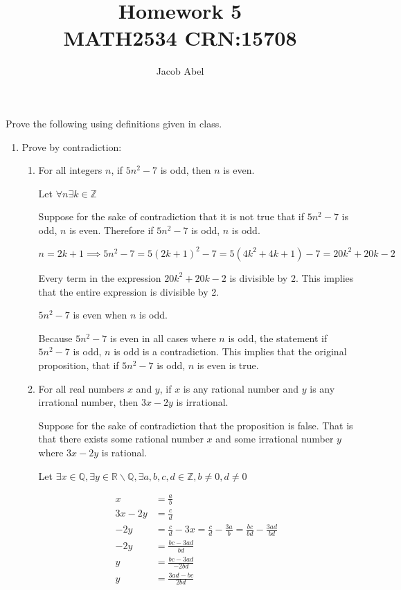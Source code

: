 \documentclass[12pt,letterpaper,titlepage]{article}
\author{Jacob Abel}
\title{	Homework 5
	\\\large MATH2534 CRN:15708
}
\begin{document}
\maketitle
\begin{raggedright}
Prove the following using definitions given in class.
\begin{enumerate}


\item Prove by contradiction:
\begin{enumerate}[label=(\alph*)]
\item For all integers $n$, if $5n^2 − 7$ is odd, then $n$ is even.

Let $\forall n \exists k \in\mathbb{Z}$

Suppose for the sake of contradiction that it is not true that if $5n^2 − 7$ is odd, $n$ is even. Therefore if $5n^2-7$ is odd, $n$ is odd.

\begin{equation*}
n = 2k + 1 \implies 5n^2-7 = 5 (2k+1)^2 - 7 = 5(4k^2+4k+1) - 7 = 20k^2+20k-2
\end{equation*}

Every term in the expression $20k^2+20k-2$ is divisible by $2$. This implies that the entire expression is divisible by 2.

$5n^2-7$ is even when $n$ is odd.

Because $5n^2-7$ is even in all cases where $n$ is odd, the statement if $5n^2-7$ is odd, $n$ is odd is a contradiction. This implies that the original proposition, that if $5n^2 − 7$ is odd, $n$ is even is true.

\item For all real numbers $x$ and $y$, if $x$ is any rational number and $y$ is any irrational number, then $3x−2y$ is irrational.

Suppose for the sake of contradiction that the proposition is false. That is that there exists some rational number $x$ and some irrational number $y$ where $3x-2y$ is rational.

Let $\exists x \in \mathbb{Q}, \exists y \in \mathbb{R\backslash Q}, \exists a,b,c,d \in \mathbb{Z}, b \neq 0, d\neq 0$

\begin{align*}
       x &= \frac{a}{b}
\\ 3x - 2y &= \frac{c}{d}
\\ -2y &= \frac{c}{d} - 3x = \frac{c}{d} - \frac{3a}{b} = \frac{bc}{bd} - \frac{3ad}{bd}
\\ -2y &= \frac{bc - 3ad}{bd}
\\   y &= \frac{bc - 3ad}{-2bd}
\\   y &= \frac{3ad - bc}{2bd} 
\end{align*}


\end{enumerate}
\end{enumerate}
\end{raggedright}
\end{document}
